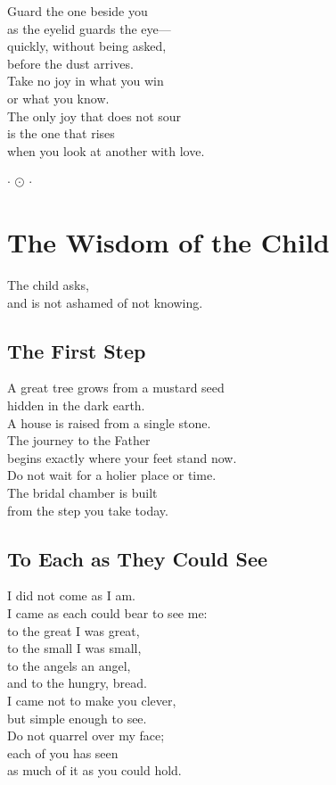 \documentclass[10pt, openright]{book}
\newcommand{\sectionbreak}{\filbreak}
\newcommand{\sayingsource}[1]{\par\nopagebreak\vspace{0.3\baselineskip}{\raggedleft\footnotesize\itshape #1\par}}
\newcommand{\ornament}{
    \vspace{1.5cm}
    \begin{center}
        \large \(\cdot\) \(\odot\) \(\cdot\)
    \end{center}
    \vspace{1.5cm}
}
\begin{document}
Guard the one beside you\\
as the eyelid guards the eye---\\
quickly, without being asked,\\
before the dust arrives.\\
Take no joy in what you win\\
or what you know.\\
The only joy that does not sour\\
is the one that rises\\
when you look at another with love.

\sayingsource{Thomas 25 · Gospel of the Hebrews}

\ornament

\chapter{The Wisdom of the Child}\label{the-wisdom-of-the-child}

\begin{center}
The child asks,\\
and is not ashamed of not knowing.
\end{center}

\sectionbreak

\section{The First Step}\label{the-first-step}

A great tree grows from a mustard seed\\
hidden in the dark earth.\\
A house is raised from a single stone.\\
The journey to the Father\\
begins exactly where your feet stand now.\\
Do not wait for a holier place or time.\\
The bridal chamber is built\\
from the step you take today.

\sayingsource{Tao Te Ching 64 · Thomas 20}

\sectionbreak

\section{To Each as They Could See}\label{to-each-as-they-could-see}

I did not come as I am.\\
I came as each could bear to see me:\\
to the great I was great,\\
to the small I was small,\\
to the angels an angel,\\
and to the hungry, bread.\\
I came not to make you clever,\\
but simple enough to see.\\
Do not quarrel over my face;\\
each of you has seen\\
as much of it as you could hold.
\end{document}

